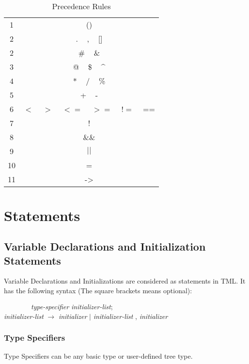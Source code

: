 \documentclass[12pt,psfig,a4]{article}
\begin{document}
\begin{table}[ht]
\begin{center}
\begin{tabular}{| c | c |}
\hline
1 & () \\
2 & . ~ , ~ [] \\
2 & \# ~ \& \\
3 & @ ~ \$ ~ \^{} \\
4 & * ~ / ~ \% \\
5 & + ~ - \\
6 & $<$ ~ $>$ ~ $<=$ ~ $>=$ ~ $!=$ ~ == \\
7 & ! \\
8 & \&\& \\
9 & $||$ \\
10 & =\\%
11 & -\textgreater \\
\hline
\end{tabular}
\caption{Precedence Rules}
\label{preRule}
\end {center}
\end{table}



\section{Statements}

\subsection{Variable Declarations and Initialization Statements}
Variable Declarations and Initializations are considered as statements in TML. It has the following syntax (The square brackets means optional):

\begin{code}
\begin{tabbing}
~~~~~~~~\= \textsl{type-specifier} \textsl{initializer-list}; \\
\> \textsl{initializer-list}  $\rightarrow$ \textsl{initializer} $\mid$ \textsl{initializer-list} , \textsl{initializer}
\end{tabbing}
\end{code}

\subsubsection{Type Specifiers} \label{typeSpec}
\label{ts}
Type Specifiers can be any basic type or user-defined tree type.
\end{document}
